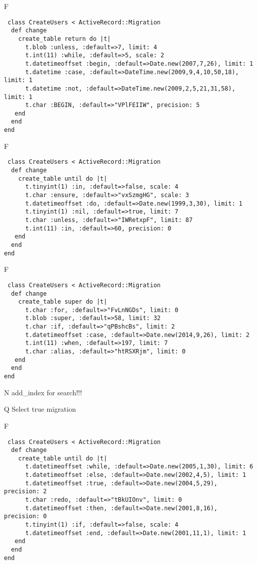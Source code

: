 F
\begin{verbatim}
 class CreateUsers < ActiveRecord::Migration 
  def change 
    create_table return do |t| 
      t.blob :unless, :default=>7, limit: 4
      t.int(11) :while, :default=>5, scale: 2
      t.datetimeoffset :begin, :default=>Date.new(2007,7,26), limit: 1
      t.datetime :case, :default=>DateTime.new(2009,9,4,10,50,18), limit: 1
      t.datetime :not, :default=>DateTime.new(2009,2,5,21,31,58), limit: 1
      t.char :BEGIN, :default=>"VPlFEIIW", precision: 5
   end 
  end 
end
\end{verbatim}

F
\begin{verbatim}
 class CreateUsers < ActiveRecord::Migration 
  def change 
    create_table until do |t| 
      t.tinyint(1) :in, :default=>false, scale: 4
      t.char :ensure, :default=>"vxSzmgHG", scale: 3
      t.datetimeoffset :do, :default=>Date.new(1999,3,30), limit: 1
      t.tinyint(1) :nil, :default=>true, limit: 7
      t.char :unless, :default=>"IWRetxpF", limit: 87
      t.int(11) :in, :default=>60, precision: 0
   end 
  end 
end
\end{verbatim}

F
\begin{verbatim}
 class CreateUsers < ActiveRecord::Migration 
  def change 
    create_table super do |t| 
      t.char :for, :default=>"FvLnNGDs", limit: 0
      t.blob :super, :default=>58, limit: 32
      t.char :if, :default=>"qPBshcBs", limit: 2
      t.datetimeoffset :case, :default=>Date.new(2014,9,26), limit: 2
      t.int(11) :when, :default=>197, limit: 7
      t.char :alias, :default=>"htRSXRjm", limit: 0
   end 
  end 
end
\end{verbatim}
N
add_index for search!!!
  
Q
Select true migration

F
\begin{verbatim}
 class CreateUsers < ActiveRecord::Migration 
  def change 
    create_table until do |t| 
      t.datetimeoffset :while, :default=>Date.new(2005,1,30), limit: 6
      t.datetimeoffset :else, :default=>Date.new(2002,4,5), limit: 1
      t.datetimeoffset :true, :default=>Date.new(2004,5,29), precision: 2
      t.char :redo, :default=>"tBkUIOnv", limit: 0
      t.datetimeoffset :then, :default=>Date.new(2001,8,16), precision: 0
      t.tinyint(1) :if, :default=>false, scale: 4
      t.datetimeoffset :end, :default=>Date.new(2001,11,1), limit: 1
   end 
  end 
end
\end{verbatim}

